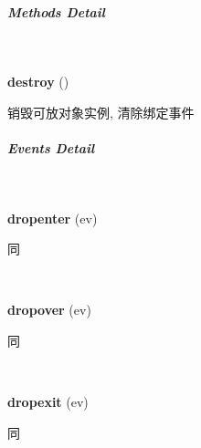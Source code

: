 \documentclass[letterpaper,10pt,english]{sphinxmanual}
\begin{document}
\subparagraph{Methods Detail}
\label{api/component/dd/droppable-delegate:methods-detail}

\begin{fulllineitems}
\label{api/component/dd/droppable-delegate:DroppableDelegate.destroy}~
\begin{DUlineblock}{0em}
\item[] \textbf{destroy} ()
\item[] 销毁可放对象实例, 清除绑定事件
\end{DUlineblock}

\end{fulllineitems}



\subparagraph{Events Detail}
\label{api/component/dd/droppable-delegate:events-detail}

\begin{fulllineitems}
\label{api/component/dd/droppable-delegate:DroppableDelegate.dropenter}~
\begin{DUlineblock}{0em}
\item[] \textbf{dropenter} (ev)
\item[] 同 {\hyperref[api/component/dd/droppable:Droppable.dropenter]{}}
\end{DUlineblock}

\end{fulllineitems}



\begin{fulllineitems}
\label{api/component/dd/droppable-delegate:DroppableDelegate.dropover}~
\begin{DUlineblock}{0em}
\item[] \textbf{dropover} (ev)
\item[] 同 {\hyperref[api/component/dd/droppable:Droppable.dropover]{}}
\end{DUlineblock}

\end{fulllineitems}



\begin{fulllineitems}
\label{api/component/dd/droppable-delegate:DroppableDelegate.dropexit}~
\begin{DUlineblock}{0em}
\item[] \textbf{dropexit} (ev)
\item[] 同 {\hyperref[api/component/dd/droppable:Droppable.dropexit]{}}
\end{DUlineblock}

\end{fulllineitems}
\end{document}

